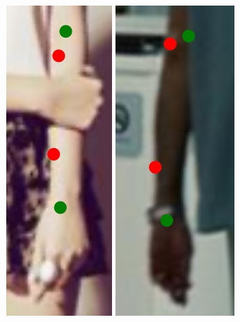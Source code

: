 \begin{figure}
    \includegraphics[height=\fh]{resources/Annotation_Correction/Fixing/fix_8}
    \hfill
    \includegraphics[height=\fh]{resources/Annotation_Correction/Fixing/fix_9}
    \hfill

\end{figure}
